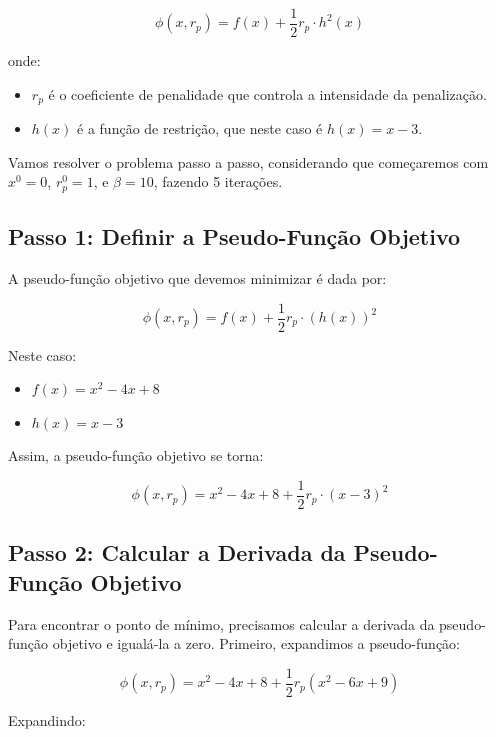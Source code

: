 \documentclass[a4paper, 12pt]{article}
\begin{document}
\begin{equation*}
    \phi(x, r_p) = f(x) + \frac{1}{2} r_p \cdot h^2(x)
\end{equation*}

onde:
\begin{itemize}
    \item $r_p$ é o coeficiente de penalidade que controla a intensidade da penalização.
    \item $h(x)$ é a função de restrição, que neste caso é $h(x) = x - 3$.
\end{itemize}

Vamos resolver o problema passo a passo, considerando que começaremos com $x^0 = 0$, $r_p^0 = 1$, e $ \beta = 10$, fazendo 5 iterações.

\subsection{Passo 1: Definir a Pseudo-Função Objetivo}
A pseudo-função objetivo que devemos minimizar é dada por:

\begin{equation*}
    \phi(x, r_p) = f(x) + \frac{1}{2} r_p \cdot (h(x))^2
\end{equation*}

Neste caso:
\begin{itemize}
    \item $f(x) = x^2 - 4x + 8$
    \item $h(x) = x - 3$
\end{itemize}

Assim, a pseudo-função objetivo se torna:

\begin{equation*}
    \phi(x, r_p) = x^2 - 4x + 8 + \frac{1}{2} r_p \cdot (x - 3)^2
\end{equation*}

\subsection{Passo 2: Calcular a Derivada da Pseudo-Função Objetivo}
Para encontrar o ponto de mínimo, precisamos calcular a derivada da pseudo-função objetivo e igualá-la a zero. Primeiro, expandimos a pseudo-função:

\begin{equation*}
    \phi(x, r_p) = x^2 - 4x + 8 + \frac{1}{2} r_p (x^2 - 6x + 9)
\end{equation*}

Expandindo:
\end{document}
